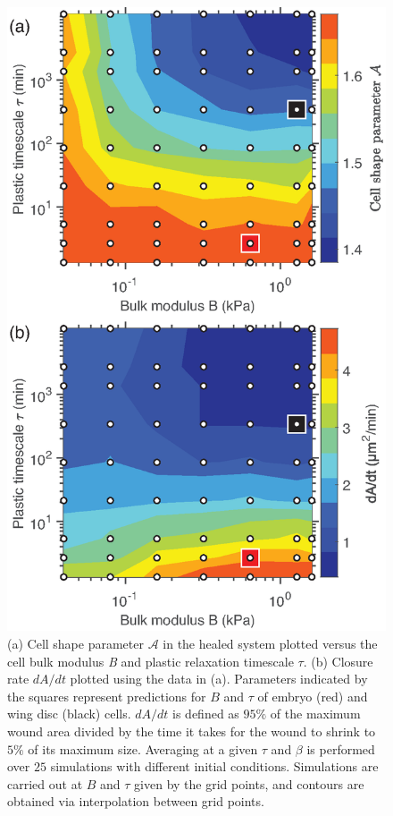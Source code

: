 \documentclass[%
 reprint,
superscriptaddress,
amsmath,amssymb,
prl,
floatfix,
]{revtex4-2}
\begin{document}
\begin{figure}[!th]
    \centering
    \includegraphics[width=\linewidth]{Fig3.eps}
\caption{(a) Cell shape parameter $\mathcal{A}$ in the healed system plotted versus the cell bulk modulus \textit{B} and plastic relaxation timescale $\tau$. (b) Closure rate $dA/dt$ plotted using the data in (a). Parameters indicated by the squares represent predictions for $B$ and $\tau$ of embryo (red) and wing disc (black) cells. $dA/dt$ is defined as $95\%$ of the maximum wound area divided by the time it takes for the wound to shrink to $5\%$ of its maximum size. Averaging at a given $\tau$ and $\beta$ is performed over $25$ simulations with different initial conditions. Simulations are carried out at $B$ and $\tau$ given by the grid points, and contours are obtained via interpolation between grid points.
}
\label{fig:heatmaps}
\end{figure}
\end{document}
